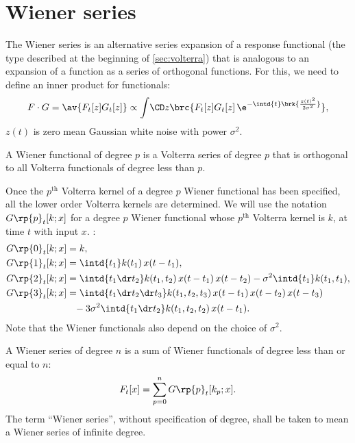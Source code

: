 \documentclass[12pt]{article}
\newcommand{\contd}[1][=]{\phantom{#1}\mathord{}}
\begin{document}

\section{Wiener series}\label{sec:wiener}

The Wiener series is an alternative series expansion of a response functional (the type described at the beginning of \cref{sec:volterra}) that is analogous to an expansion of a function as a series of orthogonal functions.
For this, we need to define an inner product for functionals:
%
\begin{equation}\label{eq:innerfunc}
  F \cdot G = \av{F_t[z]G_t[z]}
    \propto \int\!\CD z \brc{F_t[z]G_t[z]\,\e^{-\intd{t}\brk{\frac{z(t)^2}{2\sigma^2}}}},
\end{equation}
%
\ie $z(t)$ is zero mean Gaussian white noise with power $\sigma^2$.

\begin{defn}
  A Wiener functional of degree $p$ is a Volterra series of degree $p$ that is orthogonal to all Volterra functionals of degree less than $p$.
\end{defn}

Once the $p^{\text{th}}$ Volterra kernel of a degree $p$ Wiener functional has been specified, all the lower order Volterra kernels are determined.
We will use the notation $G\rp{p}_t[k;x]$ for a degree $p$ Wiener functional whose $p^{\text{th}}$ Volterra kernel is $k$, at time $t$ with input $x$.
\eg \cite[ch.2]{schetzen:1980}:
%
\begin{equation}\label{eq:wienerex}
  \begin{aligned}
    G\rp{0}_t[k;x] &= k, \\
    G\rp{1}_t[k;x] &= \intd{t_1}k(t_1)\,x(t-t_1), \\
    G\rp{2}_t[k;x] &= \intd{t_1\dr t_2} k(t_1,t_2)\,x(t-t_1)\,x(t-t_2)
                     -\sigma^2\intd{t_1}k(t_1,t_1), \\
    G\rp{3}_t[k;x] &= \intd{t_1\dr t_2\dr t_3} k(t_1,t_2,t_3)\,x(t-t_1)\,x(t-t_2)\,x(t-t_3)\\
                  &\contd
                  - 3\sigma^2\intd{t_1\dr t_2} k(t_1,t_2,t_2)\,x(t-t_1).
  \end{aligned}
\end{equation}
%
Note that the Wiener functionals also depend on the choice of $\sigma^2$.

\begin{defn}
  A Wiener series of degree $n$ is a sum of Wiener functionals of degree less than or equal to $n$:
  \begin{equation}\label{eq:wienerser}
    F_t[x] = \sum_{p=0}^n G\rp{p}_t[k_p;x].
  \end{equation}
  The term ``Wiener series'', without specification of degree, shall be taken to mean a Wiener series of infinite degree.
\end{defn}
\end{document}
